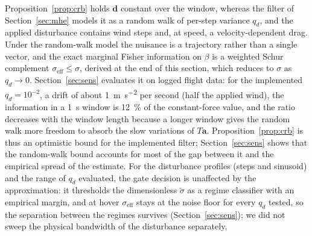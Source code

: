 \documentclass{ieeeaccess}
\newcommand{\vect}[1]{\bm{#1}}
\begin{document}
Proposition~\ref{prop:crb} holds $\vect{d}$ constant over the window, whereas the
filter of Section~\ref{sec:mhe} models it as a random walk of per-step variance
$q_d$, and the applied disturbance contains wind steps and, at speed, a
velocity-dependent drag. Under the random-walk model the nuisance is a
trajectory rather than a single vector, and the exact marginal Fisher
information on $\beta$ is a weighted Schur complement
$\sigma_{\mathrm{eff}}\leq\sigma$, derived at the end of this section, which
reduces to $\sigma$ as $q_d\to0$. Section~\ref{sec:sens} evaluates it on logged
flight data: for the implemented $q_d=10^{-2}$, a drift of about
\SI{1}{\meter\per\square\second} per second (half the applied wind), the
information in a \SI{1}{\second} window is \SI{12}{\percent} of the constant-force
value, and the ratio decreases with the window length because a longer window gives
the random walk more freedom to absorb the slow variations of $T\vect{a}$.
Proposition~\ref{prop:crb} is thus an optimistic bound for the implemented
filter; Section~\ref{sec:sens} shows that the random-walk bound accounts for most
of the gap between it and the empirical spread of the estimate. For the
disturbance profiles (steps and sinusoid) and the range of $q_d$ evaluated, the
gate decision is unaffected by the approximation: it thresholds the dimensionless
$\tilde\sigma$ as a regime classifier with an empirical margin, and at hover
$\sigma_{\mathrm{eff}}$ stays at the noise floor for every $q_d$ tested, so the
separation between the regimes survives (Section~\ref{sec:sens}); we did not
sweep the physical bandwidth of the disturbance separately.
\end{document}
